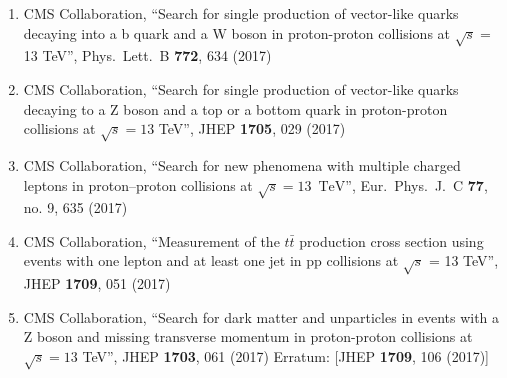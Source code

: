 \begin{enumerate}
\item CMS Collaboration, ``Search for single production of vector-like quarks decaying into a b quark and a W boson in proton-proton collisions at $\sqrt s =$ 13 TeV'', Phys.\ Lett.\ B {\bf 772}, 634 (2017)

\item CMS Collaboration, ``Search for single production of vector-like quarks decaying to a Z boson and a top or a bottom quark in proton-proton collisions at $ \sqrt{s}=13 $ TeV'', JHEP {\bf 1705}, 029 (2017)

\item CMS Collaboration, ``Search for new phenomena with multiple charged leptons in proton–proton collisions at $\sqrt{s}= 13$ $\,\text {TeV}$'', Eur.\ Phys.\ J.\ C {\bf 77}, no. 9, 635 (2017)

\item CMS Collaboration, ``Measurement of the $t \bar t$ production cross section using events with one lepton and at least one jet in pp collisions at $\sqrt{s}$  = 13 TeV'', JHEP {\bf 1709}, 051 (2017)

\item CMS Collaboration, ``Search for dark matter and unparticles in events with a Z boson and missing transverse momentum in proton-proton collisions at $ \sqrt{s}=13 $ TeV'', JHEP {\bf 1703}, 061 (2017)
  Erratum: [JHEP {\bf 1709}, 106 (2017)]


\end{enumerate}
